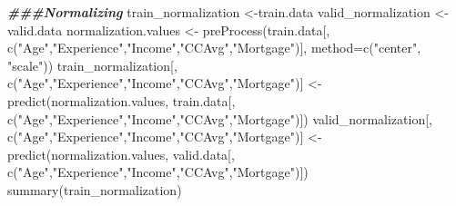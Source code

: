 \documentclass[
]{article}
\newenvironment{Shaded}{\begin{snugshade}}{\end{snugshade}}
\newcommand{\AttributeTok}[1]{\textcolor[rgb]{0.77,0.63,0.00}{#1}}
\newcommand{\DocumentationTok}[1]{\textcolor[rgb]{0.56,0.35,0.01}{\textbf{\textit{#1}}}}
\newcommand{\FunctionTok}[1]{\textcolor[rgb]{0.00,0.00,0.00}{#1}}
\newcommand{\NormalTok}[1]{#1}
\newcommand{\OtherTok}[1]{\textcolor[rgb]{0.56,0.35,0.01}{#1}}
\newcommand{\StringTok}[1]{\textcolor[rgb]{0.31,0.60,0.02}{#1}}
\begin{document}
\begin{Shaded}
\begin{Highlighting}[]
\DocumentationTok{\#\#\#Normalizing}
\NormalTok{train\_normalization }\OtherTok{\textless{}{-}}\NormalTok{train.data}
\NormalTok{valid\_normalization }\OtherTok{\textless{}{-}}\NormalTok{valid.data}
\NormalTok{normalization.values }\OtherTok{\textless{}{-}} \FunctionTok{preProcess}\NormalTok{(train.data[, }\FunctionTok{c}\NormalTok{(}\StringTok{"Age"}\NormalTok{,}\StringTok{"Experience"}\NormalTok{,}\StringTok{"Income"}\NormalTok{,}\StringTok{"CCAvg"}\NormalTok{,}\StringTok{"Mortgage"}\NormalTok{)], }\AttributeTok{method=}\FunctionTok{c}\NormalTok{(}\StringTok{"center"}\NormalTok{, }\StringTok{"scale"}\NormalTok{))}
\NormalTok{train\_normalization[, }\FunctionTok{c}\NormalTok{(}\StringTok{"Age"}\NormalTok{,}\StringTok{"Experience"}\NormalTok{,}\StringTok{"Income"}\NormalTok{,}\StringTok{"CCAvg"}\NormalTok{,}\StringTok{"Mortgage"}\NormalTok{)] }\OtherTok{\textless{}{-}} \FunctionTok{predict}\NormalTok{(normalization.values, train.data[, }\FunctionTok{c}\NormalTok{(}\StringTok{"Age"}\NormalTok{,}\StringTok{"Experience"}\NormalTok{,}\StringTok{"Income"}\NormalTok{,}\StringTok{"CCAvg"}\NormalTok{,}\StringTok{"Mortgage"}\NormalTok{)])}
\NormalTok{valid\_normalization[, }\FunctionTok{c}\NormalTok{(}\StringTok{"Age"}\NormalTok{,}\StringTok{"Experience"}\NormalTok{,}\StringTok{"Income"}\NormalTok{,}\StringTok{"CCAvg"}\NormalTok{,}\StringTok{"Mortgage"}\NormalTok{)] }\OtherTok{\textless{}{-}} \FunctionTok{predict}\NormalTok{(normalization.values, valid.data[, }\FunctionTok{c}\NormalTok{(}\StringTok{"Age"}\NormalTok{,}\StringTok{"Experience"}\NormalTok{,}\StringTok{"Income"}\NormalTok{,}\StringTok{"CCAvg"}\NormalTok{,}\StringTok{"Mortgage"}\NormalTok{)])}
\FunctionTok{summary}\NormalTok{(train\_normalization)}
\end{Highlighting}
\end{Shaded}
\end{document}
